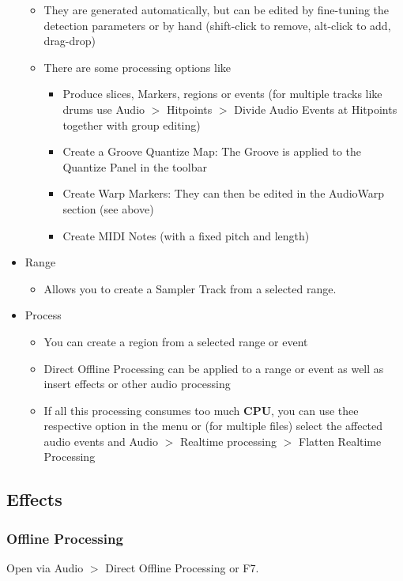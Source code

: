 \documentclass[10pt]{article}
\begin{document}
\begin{itemize}
\begin{itemize}
		\item They are generated automatically, but can be edited by fine-tuning the detection parameters or by hand (shift-click to remove, alt-click to add, drag-drop)
		\item There are some processing options like 
		\begin{itemize}
			\item Produce slices, Markers, regions or events (for multiple tracks like drums use Audio $>$ Hitpoints $>$ Divide Audio Events at Hitpoints together with group editing)
			\item Create a Groove Quantize Map: The Groove is applied to the Quantize Panel in the toolbar
			\item Create Warp Markers: They can then be edited in the AudioWarp section (see above)
			\item Create MIDI Notes (with a fixed pitch and length)
		\end{itemize}
	\end{itemize}
	\item Range
	\begin{itemize}
		\item Allows you to create a Sampler Track from a selected range.
	\end{itemize}
	\item Process
	\begin{itemize}
		\item You can create a region from a selected range or event
		\item Direct Offline Processing can be applied to a range or event as well as insert effects or other audio processing
		\item If all this processing consumes too much \textbf{CPU}, you can use thee respective option in the menu or (for multiple files) select the affected audio events and Audio $>$ Realtime processing $>$ Flatten Realtime Processing
	\end{itemize}
\end{itemize}

\subsection{Effects}

\subsubsection{Offline Processing}

Open via Audio $>$ Direct Offline Processing or F7.
\end{document}

